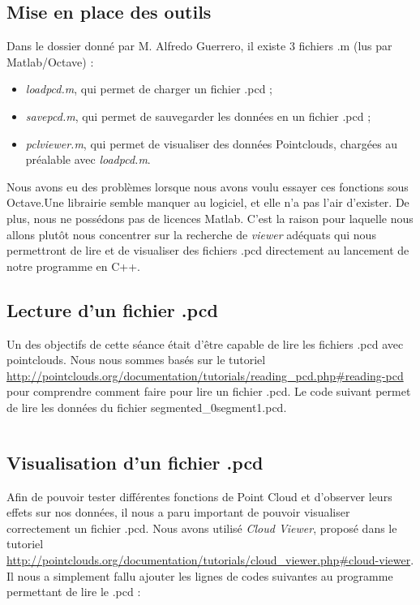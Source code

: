 \subsection{Mise en place des outils}
	Dans le dossier donné par M. Alfredo Guerrero, il existe 3 fichiers .m (lus par Matlab/Octave) :
	\begin{itemize}
	\item \textit{loadpcd.m}, qui permet de charger un fichier .pcd ;
	\item \textit{savepcd.m}, qui permet de sauvegarder les données en un fichier .pcd ;
	\item \textit{pclviewer.m}, qui permet de visualiser des données Pointclouds, chargées au préalable avec \textit{loadpcd.m}.
	\end{itemize} 

	Nous avons eu des problèmes lorsque nous avons voulu essayer ces fonctions sous Octave.Une librairie semble manquer au logiciel, et elle n'a pas l'air d'exister. De plus, nous ne possédons pas de licences Matlab. C'est la raison pour laquelle nous allons plutôt nous concentrer sur la recherche de \textit{viewer} adéquats qui nous permettront de lire et de visualiser des fichiers .pcd directement au lancement de notre programme en C++.

\subsection{Lecture d'un fichier .pcd}
	Un des objectifs de cette séance était d'être capable de lire les fichiers .pcd avec pointclouds. Nous nous sommes basés sur le tutoriel \url{http://pointclouds.org/documentation/tutorials/reading_pcd.php#reading-pcd} pour comprendre comment faire pour lire un fichier .pcd. Le code suivant permet de lire les données du fichier segmented\_0segment1.pcd.

	\inputminted[tabsize=4,linenos,fontsize=\small]{cpp}{../tests/lecture_data/pcd_read.cpp}

\subsection{Visualisation d'un fichier .pcd}
	Afin de pouvoir tester différentes fonctions de Point Cloud et d'observer leurs effets sur nos données, il nous a paru important de pouvoir visualiser correctement un fichier .pcd. Nous avons utilisé \emph{Cloud Viewer}, proposé dans le tutoriel \url{http://pointclouds.org/documentation/tutorials/cloud_viewer.php#cloud-viewer}. Il nous a simplement fallu ajouter les lignes de codes suivantes au programme permettant de lire le .pcd :

	\inputminted[tabsize=4,linenos,fontsize=\small]{cpp}{code/visualisation.cpp}
